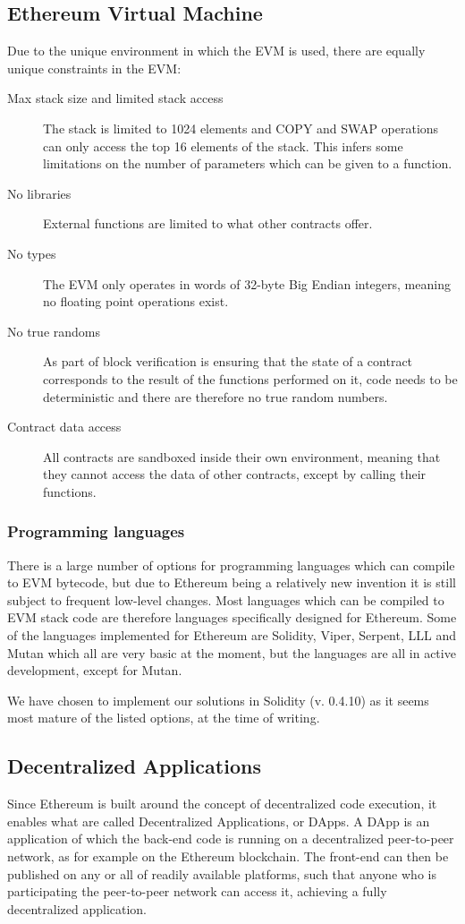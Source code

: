 \documentclass{article}
\begin{document}
		\subsection{Ethereum Virtual Machine}	
		\label{sec:ethereum-virtual-machine}
		Due to the unique environment in which the EVM is used, there are equally unique constraints in the EVM:
		\begin{description}
			\item [Max stack size and limited stack access] The stack is limited to 1024 elements and COPY and SWAP operations can only access the top 16 elements of the stack. This infers some limitations on the number of parameters which can be given to a function.
			\item [No libraries] External functions are limited to what other contracts offer.  
			\item [No types] The EVM only operates in words of 32-byte Big Endian integers, meaning no floating point operations exist.
			\item [No true randoms] As part of block verification is ensuring that the state of a contract corresponds to the result of the functions performed on it, code needs to be deterministic and there are therefore no true random numbers.
			\item [Contract data access] All contracts are sandboxed inside their own environment, meaning that they cannot access the data of other contracts, except by calling their functions.
		\end{description}

		\subsubsection{Programming languages}
		There is a large number of options for programming languages which can compile to EVM bytecode, but due to Ethereum being a relatively new invention it is still subject to frequent low-level changes. 
		Most languages which can be compiled to EVM stack code are therefore languages specifically designed for Ethereum.
		Some of the languages implemented for Ethereum are Solidity, Viper, Serpent, LLL and Mutan which all are very basic at the moment, but the languages are all in active development, except for Mutan.

		We have chosen to implement our solutions in Solidity (v. 0.4.10) as it seems most mature of the listed options, at the time of writing.

		\subsection{Decentralized Applications}
		Since Ethereum is built around the concept of decentralized code execution, it enables what are called Decentralized Applications, or DApps. 
		A DApp is an application of which the back-end code is running on a decentralized peer-to-peer network, as for example on the Ethereum blockchain.
		The front-end can then be published on any or all of readily available platforms, such that anyone who is participating the peer-to-peer network can access it, achieving a fully decentralized application.
\end{document}
